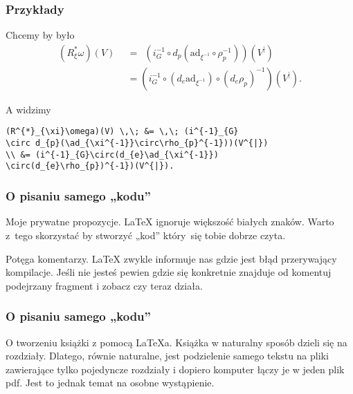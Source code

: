 \documentclass[10pt,t]{beamer}
\newcommand{\ad}{\textrm{ad}}
\begin{document}
\begin{frame}[fragile]
  \frametitle{Przykłady}


  Chcemy by było
  \begin{equation}
    \begin{split}
      (R^{*}_{\xi}\omega)(V) \,\;
      &= \,\; (i^{-1}_{G}\circ d_{p}(\ad_{\xi^{-1}}\circ\rho_{p}^{-1}))(V^{|}) \\
      &=
        (i^{-1}_{G}\circ(d_{e}\ad_{\xi^{-1}})\circ(d_{e}\rho_{p})^{-1})(V^{|}).
    \end{split}
  \end{equation}

  A widzimy
\begin{verbatim}
(R^{*}_{\xi}\omega)(V) \,\; &= \,\; (i^{-1}_{G}
\circ d_{p}(\ad_{\xi^{-1}}\circ\rho_{p}^{-1}))(V^{|})
\\ &= (i^{-1}_{G}\circ(d_{e}\ad_{\xi^{-1}})
\circ(d_{e}\rho_{p})^{-1})(V^{|}).
\end{verbatim}

\end{frame}





\begin{frame}
  \frametitle{O pisaniu samego „kodu”}


  Moje prywatne propozycje.
  \LaTeX{} ignoruje większość białych znaków. Warto z~tego
  skorzystać by stworzyć „kod” który~się tobie dobrze czyta.

  Potęga komentarzy.
  \LaTeX{} zwykle informuje nas gdzie jest błąd przerywający
  kompilacje. Jeśli nie jesteś pewien gdzie się konkretnie
  znajduje od komentuj podejrzany fragment i zobacz czy teraz działa.

\end{frame}





\begin{frame}
  \frametitle{O pisaniu samego „kodu”}


  O tworzeniu książki z pomocą \LaTeX a.
  Książka w naturalny sposób dzieli się na rozdziały. Dlatego,
  równie naturalne, jest podzielenie samego tekstu na pliki
  zawierające tylko pojedyncze rozdziały i dopiero komputer łączy je
  w jeden plik pdf. Jest to jednak temat na osobne wystąpienie.

\end{frame}
\end{document}
